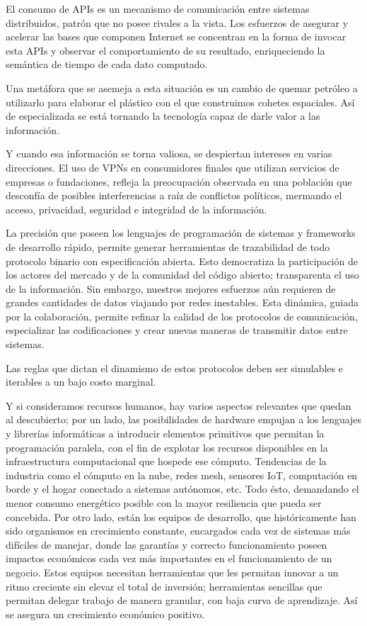 El consumo de APIs es un mecanismo de comunicación entre sistemas distribuidos, patrón que no posee rivales a la vista. Los esfuerzos de asegurar y acelerar las bases que componen Internet se concentran en la forma de invocar esta APIs y observar el comportamiento de su resultado, enriqueciendo la semántica de tiempo de cada dato computado.

Una metáfora que se asemeja a esta situación es un cambio de quemar petróleo a utilizarlo para elaborar el plástico con el que construimos cohetes espaciales. Así de especializada se está tornando la tecnología capaz de darle valor a las información.


Y cuando esa información se torna valiosa, se despiertan intereses en varias direcciones. El uso de VPNs en consumidores finales que utilizan servicios de empresas o fundaciones, refleja la preocupación observada en una población que desconfía de posibles interferencias a raíz de conflictos políticos, mermando el acceso, privacidad, seguridad e integridad de la información.

La precisión que poseen los lenguajes de programación de sistemas y frameworks de desarrollo rápido, permite generar herramientas de trazabilidad de todo protocolo binario con especificación abierta. Esto democratiza la participación de los actores del mercado y de la comunidad del código abierto; transparenta el uso de la información. Sin embargo, nuestros mejores esfuerzos aún requieren de grandes cantidades de datos viajando por redes inestables. Esta dinámica, guiada por la colaboración, permite refinar la calidad de los protocolos de comunicación, especializar las codificaciones y crear nuevas maneras de transmitir datos entre sistemas.

Las reglas que dictan el dinamismo de estos protocolos deben ser simulables e iterables a un bajo costo marginal.

Y si consideramos recursos humanos, hay varios aspectos relevantes que quedan al descubierto; por un lado, las posibilidades de hardware empujan a los lenguajes y librerías informáticas a introducir elementos primitivos que permitan la programación paralela, con el fin de explotar los recursos disponibles en la infraestructura computacional que hospede ese cómputo. Tendencias de la industria como el cómputo en la nube, redes mesh, sensores IoT, computación en borde y el hogar conectado a sistemas autónomos, etc. Todo ésto, demandando el menor consumo energético posible con la mayor resiliencia que pueda ser concebida. Por otro lado, están los equipos de desarrollo, que históricamente han sido organismos en crecimiento constante, encargados cada vez de sistemas más difíciles de manejar, donde las garantías y correcto funcionamiento poseen impactos económicos cada vez más importantes en el funcionamiento de un negocio. Estos equipos necesitan herramientas que les permitan innovar a un ritmo creciente sin elevar el total de inversión; herramientas sencillas que permitan delegar trabajo de manera granular, con baja curva de aprendizaje. Así se asegura un crecimiento económico positivo.

